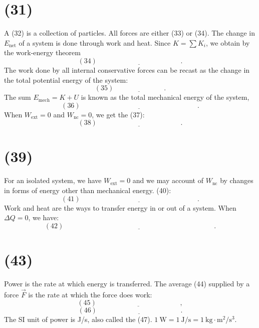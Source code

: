 \documentclass[11pt,a4paper]{report}
\begin{document}
\section{(31)\underline{\hspace{7cm}}}
A (32)\underline{\hspace{3cm}} is a collection of particles. All forces are either (33)\underline{\hspace{3cm}} or (34)\underline{\hspace{3cm}}. The change in $E_\mathrm{net}$ of a system is done through work and heat. Since $K = \sum{K_i}$, we obtain by the work-energy theorem $$\left(34\right)\underline{\hspace{5cm}}.$$
The work done by all internal conservative forces can be recast as the change in the total potential energy of the system: $$\left(35\right)\underline{\hspace{3cm}}.$$
The sum $E_\mathrm{mech} = K + U$ is known as the total mechanical energy of the system, $$\left(36\right)\underline{\hspace{7cm}}.$$
When $W_\mathrm{ext} = 0$ and $W_\mathrm{nc} = 0$, we get the (37)\underline{\hspace{5cm}}: $$\left(38\right)\underline{\hspace{5cm}}.$$

\section{(39)\underline{\hspace{7cm}}}
For an isolated system, we have $W_\mathrm{ext} = 0$ and we may account of $W_\mathrm{nc}$ by changes in forms of energy other than mechanical energy. (40)\underline{\hspace{5cm}}: $$\left(41\right)\underline{\hspace{7cm}}.$$
Work and heat are the ways to transfer energy in or out of a system. When $\Delta{Q} = 0$, we have: $$\left(42\right)\underline{\hspace{9cm}}.$$

\section{(43)\underline{\hspace{5cm}}}
Power is the rate at which energy is transferred. The average (44)\underline{\hspace{3cm}} supplied by a force $\vec{F}$ is the rate at which the force does work: $$\left(45\right)\underline{\hspace{5cm}},$$ $$\left(46\right)\underline{\hspace{5cm}}.$$
The SI unit of power is J/s, also called the (47)\underline{\hspace{3cm}}. $1 \mathrm{\ W} = 1 \mathrm{\ J} / \mathrm{s} = 1 \mathrm{\ kg} \cdot \mathrm{m}^2 / \mathrm{s}^3$.
\end{document}
